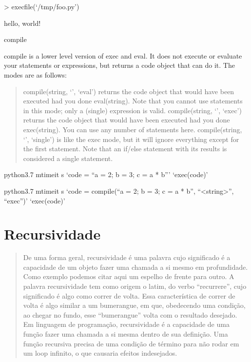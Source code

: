 \documentclass[letterpaper,10pt,brazil]{sphinxmanual}
\begin{document}
\textgreater{} execfile(‘/tmp/foo.py’)

hello, world!

compile

compile is a lower level version of exec and eval. It does not execute or evaluate your statements or expressions, but returns a code object that can do it. The modes are as follows:
\begin{quote}

compile(string, ‘’, ‘eval’) returns the code object that would have been executed had you done eval(string). Note that you cannot use statements in this mode; only a (single) expression is valid.
compile(string, ‘’, ‘exec’) returns the code object that would have been executed had you done exec(string). You can use any number of statements here.
compile(string, ‘’, ‘single’) is like the exec mode, but it will ignore everything except for the first statement. Note that an if/else statement with its results is considered a single statement.
\end{quote}


python3.7 \sphinxhyphen{}mtimeit \sphinxhyphen{}s ‘code = “a = 2; b = 3; c = a * b”’ ‘exec(code)’

python3.7 \sphinxhyphen{}mtimeit \sphinxhyphen{}s ‘code = compile(“a = 2; b = 3; c = a * b”, “\textless{}string\textgreater{}”, “exec”)’ ‘exec(code)’


\chapter{Recursividade}
\label{\detokenize{content/recursive:recursividade}}\label{\detokenize{content/recursive::doc}}\begin{quote}

De uma forma geral, recursividade é uma palavra cujo significado é a capacidade de um objeto fazer uma chamada a si mesmo em profundidade.
Como exemplo podemos citar aqui um espelho de frente para outro.
A palavra recursividade tem como origem o latim, do verbo “recurrere”, cujo significado é algo como correr de volta. Essa característica de correr de volta é algo similar a um bumerangue, em que, obedecendo uma condição, ao chegar no fundo, esse “bumerangue” volta com o resultado desejado.
Em linguagem de programação, recursividade é a capacidade de uma função fazer uma chamada a si mesma dentro de sua definição. Uma função recursiva precisa de uma condição de término para não rodar em um loop infinito, o que causaria efeitos indesejados.
\end{quote}
\end{document}
